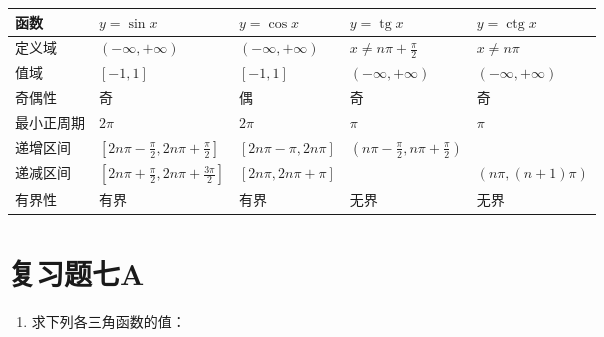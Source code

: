 {\def\LTcaptype{none} %
\begin{longtable}[]{@{}
  >{\raggedright\arraybackslash}p{}
  >{\raggedright\arraybackslash}p{}
  >{\raggedright\arraybackslash}p{}
  >{\raggedright\arraybackslash}p{}
  >{\raggedright\arraybackslash}p{}@{}}
\toprule\noalign{}
\begin{minipage}[b]{\linewidth}\raggedright
函数
\end{minipage} & \begin{minipage}[b]{\linewidth}\raggedright
\(y=\sin x\)
\end{minipage} & \begin{minipage}[b]{\linewidth}\raggedright
\(y=\cos x\)
\end{minipage} & \begin{minipage}[b]{\linewidth}\raggedright
\(y=\operatorname{tg}x\)
\end{minipage} & \begin{minipage}[b]{\linewidth}\raggedright
\(y=\operatorname{ctg}x\)
\end{minipage} \\
\midrule\noalign{}
\endhead
\bottomrule\noalign{}
\endlastfoot
定义域 & \((-\infty,+\infty)\) & \((-\infty,+\infty)\) &
\(x\ne n\pi+\frac\pi2\) & \(x\ne n\pi\) \\
值域 & \([-1,1]\) & \([-1,1]\) & \((-\infty,+\infty)\) &
\((-\infty,+\infty)\) \\
奇偶性 & 奇 & 偶 & 奇 & 奇 \\
最小正周期 & \(2\pi\) & \(2\pi\) & \(\pi\) & \(\pi\) \\
递增区间 & \([2n\pi-\frac\pi2,2n\pi+\frac\pi2]\) & \([2n\pi-\pi,2n\pi]\)
& \((n\pi-\frac\pi2,n\pi+\frac\pi2)\) & \\
递减区间 & \([2n\pi+\frac\pi2,2n\pi+\frac{3\pi}2]\) &
\([2n\pi,2n\pi+\pi]\) & & \((n\pi,(n+1)\pi)\) \\
有界性 & 有界 & 有界 & 无界 & 无界 \\
\end{longtable}
}

\section{复习题七A}

\begin{enumerate}
\item
  求下列各三角函数的值：
\end{enumerate}

